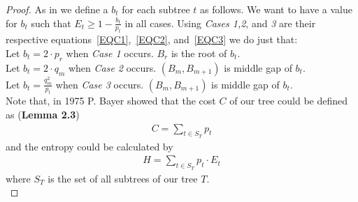 \documentclass[letterpaper,12pt,titlepage,oneside,final]{book}
\theoremstyle{plain}
\begin{document}
\begin{proof}
As in \cite{bayer1975improved} we define a $b_t$ for each subtree $t$ as follows. We want to have a value for $b_t$ such that $E_t \geq 1 - \frac{b_t}{p_t}$ in all cases. Using \textit{Cases 1,2}, and \textit{3} are their respective equations~\ref{EQC1},~\ref{EQC2}, and~\ref{EQC3} we do just that: \\
Let $b_t=2\cdot p_r$ when \textit{Case 1} occurs. $B_r$ is the root of $b_t$. \\
Let $b_t=2\cdot q_m$ when \textit{Case 2} occurs. $(B_m, B_{m+1})$ is middle gap of $b_t$. \\
Let $b_t=\frac{q_m^2}{p_t}$ when \textit{Case 3} occurs. $(B_m, B_{m+1})$ is middle gap of $b_t$. \\


Note that, in 1975 P. Bayer \cite{bayer1975improved} showed that the cost $C$ of our tree could be defined as (\textbf{Lemma 2.3}) \\
\begin{align*}
C = \sum_{t \in S_T} p_t
\end{align*}
and the entropy could be calculated by
\begin{align*}
H = \sum_{t \in S_T} p_t \cdot E_t
\end{align*}  
where $S_T$ is the set of all subtrees of our tree $T$. \\


\end{proof}
\end{document}
